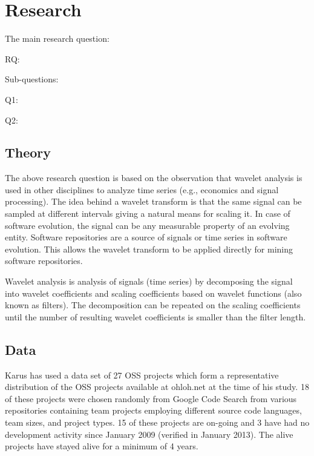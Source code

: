 \section{Research}

The main research question:
\begin{description}
	\item[RQ:] \emph{\researchQuestion}
\end{description}
Sub-questions:
\begin{description}
	\item[Q1:] \emph{\subQuestionOne}
	\item[Q2:] \emph{\subQuestionTwo}
\end{description}

\subsection{Theory}
The above research question is based on the observation that wavelet analysis is
used in other disciplines to analyze time series (e.g., economics and signal
processing). The idea behind a wavelet transform is that the same signal can
be sampled at different intervals giving a natural means for scaling it. In
case of software evolution, the signal can be any measurable property of an
evolving entity. Software repositories are a source of signals or time series
in software evolution. This allows the wavelet transform to be applied directly
for mining software repositories.

Wavelet analysis is analysis of signals (time series) by decomposing the signal
into wavelet coefficients and scaling coefficients based on wavelet functions
(also known as filters). The decomposition can be repeated on the scaling
coefficients until the number of resulting wavelet coefficients is smaller than
the filter length.

\subsection{Data}
Karus has used a data set of 27 OSS projects which form a representative
distribution of the OSS projects available at ohloh.net at the time of his
study. 18 of these projects were chosen randomly from Google Code Search from
various repositories containing team projects employing different source code
languages, team sizes, and project types. 15 of these projects are on-going and
3 have had no development activity since January 2009 (verified in January
2013). The alive projects have stayed alive for a minimum of 4 years.

